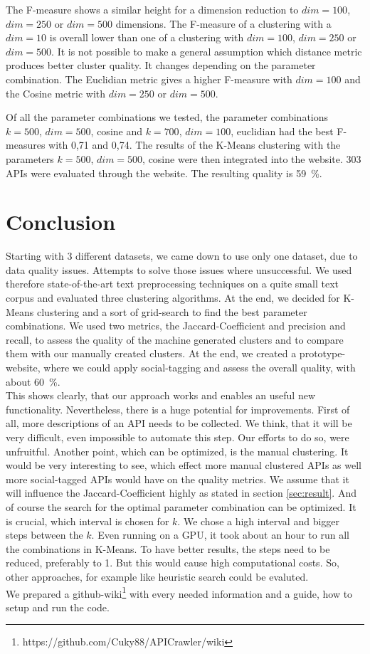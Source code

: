\documentclass[a4paper]{IEEEtran}
\begin{document}
The F-measure shows a similar height for a dimension reduction to $dim ⁡= 100$, $dim⁡= 250$ or $dim⁡= 500$ dimensions. The F-measure of a clustering with a $dim=10$ is overall lower than one of a clustering with $dim⁡= 100$, $dim⁡= 250$ or $dim⁡= 500$. 
It is not possible to make a general assumption which distance metric produces better cluster quality. It changes depending on the parameter combination. The Euclidian metric gives a higher F-measure with $dim⁡= 100$ and the Cosine metric with $dim⁡= 250$ or $dim⁡= 500$.

Of all the parameter combinations we tested, the parameter combinations $k⁡= 500$, $dim⁡= 500$, cosine and $k⁡= 700$, $dim⁡= 100$, euclidian had the best F-measures with 0,71 and 0,74.
The results of the K-Means clustering with the parameters $k⁡= 500$, $dim⁡= 500$, cosine were then integrated into the website. 303 APIs were evaluated through the website. The resulting quality is 59~\%.

\section{Conclusion}
Starting with 3 different datasets, we came down to use only one dataset, due to data quality issues. Attempts to solve those issues where unsuccessful. We used therefore state-of-the-art text preprocessing techniques on a quite small text corpus and evaluated three clustering algorithms. At the end, we decided for K-Means clustering and a sort of grid-search to find the best parameter combinations. We used two metrics, the Jaccard-Coefficient and precision and recall, to assess the quality of the machine generated clusters and to compare them with our manually created clusters. At the end, we created a prototype-website, where we could apply social-tagging and assess the overall quality, with about 60~\%.\\

This shows clearly, that our approach works and enables an useful new functionality. Nevertheless, there is a huge potential for improvements. First of all, more descriptions of an API needs to be collected. We think, that it will be very difficult, even impossible to automate this step. Our efforts to do so, were unfruitful. Another point, which can be optimized, is the manual clustering. It would be very interesting to see, which effect more manual clustered APIs as well more social-tagged APIs would have on the quality metrics. We assume that it will influence the Jaccard-Coefficient highly as stated in section \ref{sec:result}. And of course the search for the optimal parameter combination can be optimized. It is crucial, which interval is chosen for $k$. We chose a high interval and bigger steps between the $k$. Even running on a GPU, it took about an hour to run all the combinations in K-Means. To have better results, the steps need to be reduced, preferably to 1. But this would cause high computational costs. So, other approaches, for example like heuristic search could be evaluted.\\

We prepared a github-wiki\footnote{https://github.com/Cuky88/APICrawler/wiki} with every needed information and a guide, how to setup and run the code. 



\end{document}
